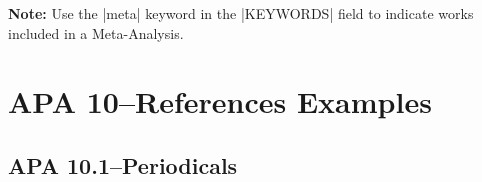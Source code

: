 \documentclass[paper=a4]{article}
\begin{document}
\newpage
\begin{refsection}

\nocite{9.51:1,9.51:2}

\printbibliography[title={APA 9.51--Annotated Bibliographies}]

\end{refsection}
\newpage
\begin{refsection}

\nocite{9.52:1,9.52:2,9.52:3,9.52:4}

\printbibliography[title={APA 9.52--References Included in a Meta-Analysis}]

\noindent\textbf{Note:} Use the |meta| keyword in the |KEYWORDS| field to
indicate works included in a Meta-Analysis.

\end{refsection}
\newpage
\section*{APA 10--References Examples}
\subsection*{APA 10.1--Periodicals}
\end{document}
